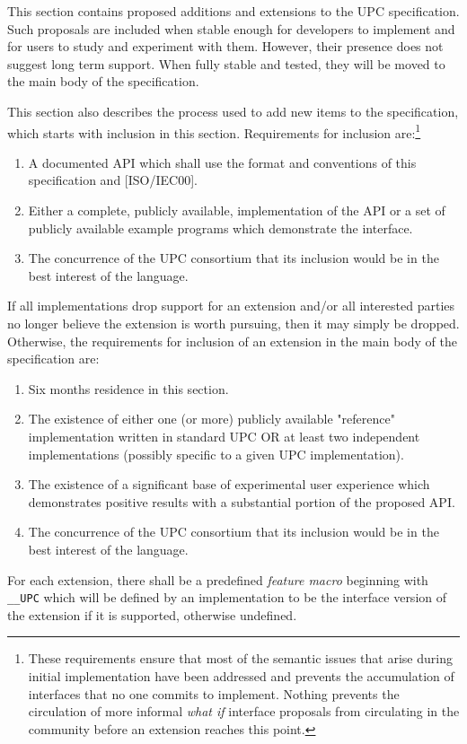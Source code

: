\np This section contains proposed additions and extensions to the UPC
     specification.  Such proposals are included when stable enough for
     developers to implement and for users to study and experiment with them.
     However, their presence does not suggest long term support.  When fully
     stable and tested, they will be moved to the main body of the specification.

\np This section also describes the process used to add new items to the 
    specification, which starts with inclusion in this section.  Requirements
    for inclusion are:\footnote{These requirements ensure that most of the
    semantic issues that arise during initial implementation have been addressed
    and prevents the accumulation of interfaces that no one commits to
    implement. Nothing prevents the circulation of more informal {\em what if} 
    interface proposals from circulating in the community before an extension
    reaches this point.} 

\begin{enumerate}
\item A documented API which shall use the format and conventions of
    this specification and [ISO/IEC00].

\item Either a complete, publicly available, implementation of the API
    or a set of publicly available example programs which demonstrate
    the interface.
    
\item The concurrence of the UPC consortium that its inclusion would be
    in the best interest of the language.    
\end{enumerate}

\np If all implementations drop support for an extension and/or all interested parties
    no longer believe the extension is worth pursuing, then it may simply be dropped.
    Otherwise, the requirements for inclusion of an extension in the main body of the
    specification are:

\begin{enumerate}
\item Six months residence in this section.

\item The existence of either one (or more) publicly available "reference" implementation 
written in standard UPC OR at least two independent implementations (possibly specific 
to a given UPC implementation).

\item The existence of a significant base of experimental user experience
   which demonstrates positive results with a substantial portion of the
   proposed API.

\item The concurrence of the UPC consortium that its inclusion would be
    in the best interest of the language.
\end{enumerate}

\np For each extension, there shall be a predefined {\em feature macro}
   beginning with {\tt \_\_UPC} which will be defined by an implementation
   to be the interface version of the extension if it is supported, otherwise
   undefined.


